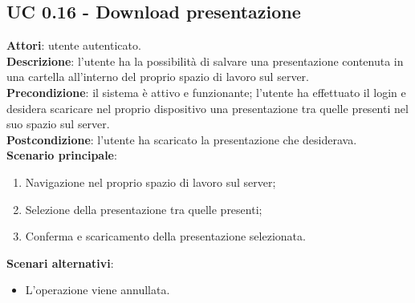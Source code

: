\subsection{UC 0.16 - Download presentazione}{
	\label{uc0.16}
	\textbf{Attori}: utente autenticato.	\\
	\textbf{Descrizione}: l'utente ha la possibilità di salvare una presentazione contenuta in una cartella all'interno del proprio spazio di lavoro sul server. \\
	\textbf{Precondizione}: il sistema è attivo e funzionante; l'utente ha effettuato il login e desidera scaricare nel proprio dispositivo una presentazione tra quelle presenti nel suo spazio sul server.	\\
	\textbf{Postcondizione}: l'utente ha scaricato la presentazione che desiderava.	\\
	\textbf{Scenario principale}:
	\begin{enumerate}
		\item Navigazione nel proprio spazio di lavoro sul server;
		\item Selezione della presentazione tra quelle presenti;
		\item Conferma e scaricamento della presentazione selezionata.
	\end{enumerate}
	\textbf{Scenari alternativi}: 
	\begin{itemize}
		\item L'operazione viene annullata.
	\end{itemize}
	}